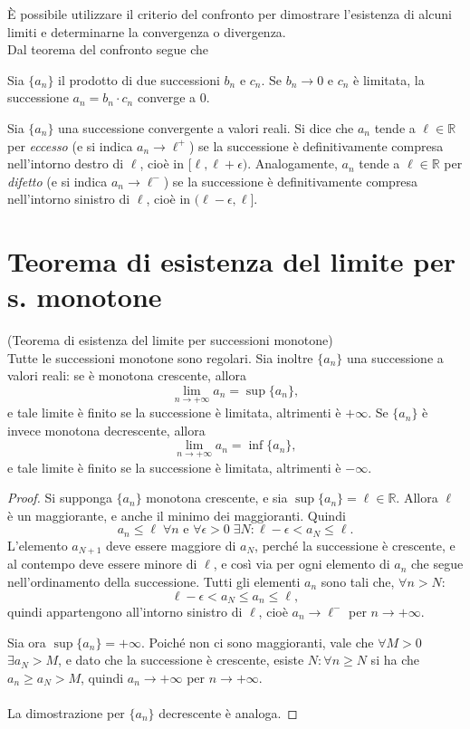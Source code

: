 \documentclass[a4paper,12pt, oneside]{book}
\begin{document}
È possibile utilizzare il criterio del confronto per dimostrare l'esistenza di alcuni limiti e determinarne la convergenza o divergenza.\\
Dal teorema del confronto segue che
\begin{osservazione}
Sia $\{a_n\}$ il prodotto di due successioni $b_n$ e $c_n$. Se $b_n\to 0$ e $c_n$ è limitata, la successione $a_n=b_n\cdot c_n$ converge a 0.
\end{osservazione}
\begin{definizione}
Sia $\{a_n\}$ una successione convergente a valori reali. Si dice che $a_n$ tende a $\ell\in\mathbb{R}$ per \emph{eccesso} (e si indica $a_n\to\ell^+$) se la successione è definitivamente compresa nell'intorno destro di $\ell$, cioè in $[\ell,\ell+\epsilon)$.
Analogamente, $a_n$ tende a $\ell\in\mathbb{R}$ per \emph{difetto} (e si indica $a_n\to\ell^-$) se la successione è definitivamente compresa nell'intorno sinistro di $\ell$, cioè in $(\ell-\epsilon,\ell]$.
\end{definizione}
\section{Teorema di esistenza del limite per s. monotone}
\begin{teorema}(Teorema di esistenza del limite per successioni monotone)\\
Tutte le successioni monotone sono regolari. Sia inoltre $\{a_n\}$ una successione a valori reali: se è monotona crescente, allora
$$\lim_{n\to +\infty} a_n=\sup\{a_n\},$$
e tale limite è finito se la successione è limitata, altrimenti è $+\infty$.
Se $\{a_n\}$ è invece monotona decrescente, allora
$$\lim_{n\to +\infty} a_n=\inf\{a_n\},$$
e tale limite è finito se la successione è limitata, altrimenti è $-\infty$.
\end{teorema}
\begin{proof}
Si supponga $\{a_n\}$ monotona crescente, e sia $\sup\{a_n\}=\ell\in\mathbb{R}$. Allora $\ell$ è un maggiorante, e anche il minimo dei maggioranti. Quindi
$$a_n\leq\ell\;\forall n\text{ e }\forall\epsilon>0\;\exists N\colon\ell-\epsilon<a_N\leq\ell.$$
L'elemento $a_{N+1}$ deve essere maggiore di $a_N$, perché la successione è crescente, e al contempo deve essere minore di $\ell$, e così via per ogni elemento di $a_n$ che segue nell'ordinamento della successione. Tutti gli elementi $a_n$ sono tali che, $\forall n>N$:
$$\ell-\epsilon<a_N\leq a_n\leq\ell,$$
quindi appartengono all'intorno sinistro di $\ell$, cioè $a_n\to\ell^-$ per $n\to +\infty$.

Sia ora $\sup\{a_n\}=+\infty$. Poiché non ci sono maggioranti, vale che $\forall M>0$ $\exists a_N>M$, e dato che la successione è crescente, esiste $N\colon\forall n\geq N$ si ha che $a_n\geq a_N>M$, quindi $a_n\to +\infty$ per $n\to +\infty$.\\\\
La dimostrazione per $\{a_n\}$ decrescente è analoga.
\end{proof}
\end{document}
